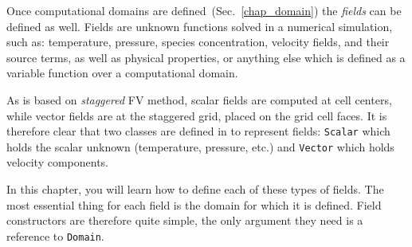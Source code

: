 \label{chap_fields}

Once computational domains are defined~(Sec.~\ref{chap_domain}) the
{\em fields} can be defined as well. Fields are unknown functions  
solved in a numerical simulation, such as: temperature, pressure,
species concentration, velocity fields, and their source terms, as well
as physical properties, or anything else which is defined as a 
variable function over a computational domain. 

As {\psiboil} is based on {\em staggered} FV method, scalar fields   
are computed at cell centers, while vector fields are at the staggered grid, 
placed on the grid cell faces. It is therefore clear that two classes are 
defined in {\psiboil} to represent fields: {\tt Scalar} which holds the
scalar unknown (temperature, pressure, etc.) and {\tt Vector}
which holds velocity components. 

In this chapter, you will learn how to define each of these types
of fields. The most essential thing for each field is the 
domain for which it is defined. Field constructors are therefore
quite simple, the only argument they need is a reference to {\tt Domain}.
